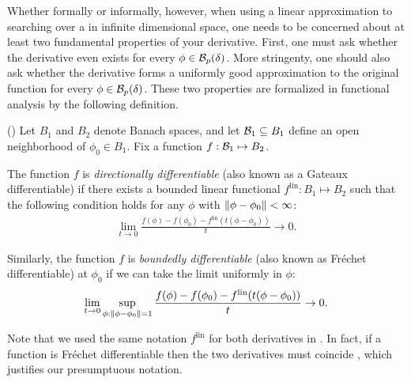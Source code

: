 
Whether formally or informally, however, when using a linear approximation to
searching over a in infinite dimensional space, one needs to be concerned about
at least two fundamental properties of your derivative.  First, one must ask
whether the derivative even exists for every $\phi \in \mathcal{B}_p(\delta)$. More
stringenty, one should also ask whether the derivative forms a uniformly good
approximation to the original function for every $\phi \in \mathcal{B}_p(\delta)$.
These two properties are formalized in functional analysis by the following
definition.

\begin{defn}
    (\citep[Definition 4.5]{zeidler:2013:functional})
%
Let $B_1$ and $B_2$ denote Banach spaces, and let $\mathcal{B}_1 \subseteq B_1$ define
an open neighborhood of $\phi_0 \in B_1$.  Fix a function $f: \mathcal{B}_1
\mapsto B_2$.

The function $f$ is {\em directionally differentiable} (also known as a Gateaux
differentiable) if there exists a bounded linear functional $f^{\mathrm{lin}}:
B_1 \mapsto B_2$ such that the following condition holds for any
$\phi$ with $\left\Vert\phi - \phi_0\right\Vert < \infty$:
%
\begin{align*}
%
\lim_{t \rightarrow 0}
    \frac{f(\phi) - f(\phi_0) -
          f^{\mathrm{lin}}(t (\phi - \phi_0) )
         }{t} \rightarrow 0.
%
\end{align*}
%

Similarly, the function $f$ is {\em boundedly differentiable} (also known as
Fr{\'echet} differentiable) at $\phi_0$ if we can take the limit uniformly in
$\phi$:
%
\begin{align*}
%
\lim_{t \rightarrow 0}
    \sup_{\phi: \norm{\phi - \phi_0} = 1}
    \frac{f(\phi) - f(\phi_0) -
          f^{\mathrm{lin}}(t (\phi - \phi_0))
         }{t} \rightarrow 0.
%
\end{align*}
%
\end{defn}

Note that we used the same notation $f^{\mathrm{lin}}$ for both derivatives in
.  In fact, if a function is Fr{\'e}chet differentiable
then the two derivatives must coincide \citep[Proposition
4.8]{zeidler:2013:functional}, which justifies our presumptuous notation.

